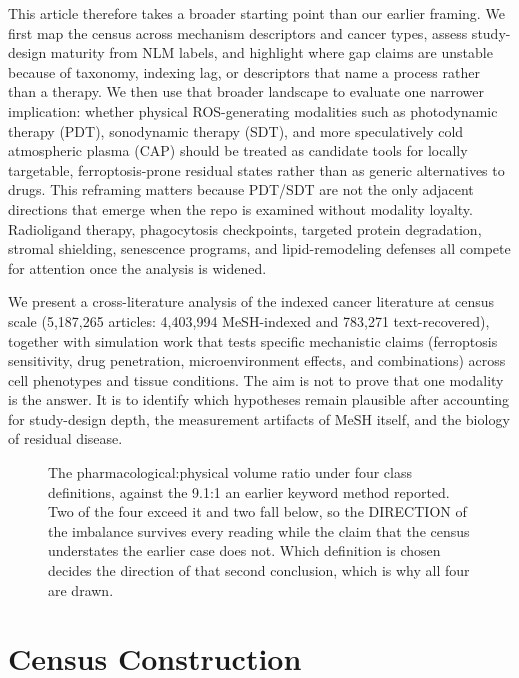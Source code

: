 \documentclass[11pt,twoside,openright]{report}
\begin{document}
This article therefore takes a broader starting point than our earlier framing. We first map the census across mechanism descriptors and cancer types, assess study-design maturity from NLM labels, and highlight where gap claims are unstable because of taxonomy, indexing lag, or descriptors that name a process rather than a therapy. We then use that broader landscape to evaluate one narrower implication: whether physical ROS-generating modalities such as photodynamic therapy (PDT), sonodynamic therapy (SDT), and more speculatively cold atmospheric plasma (CAP) should be treated as candidate tools for locally targetable, ferroptosis-prone residual states rather than as generic alternatives to drugs. This reframing matters because PDT/SDT are not the only adjacent directions that emerge when the repo is examined without modality loyalty. Radioligand therapy, phagocytosis checkpoints, targeted protein degradation, stromal shielding, senescence programs, and lipid-remodeling defenses all compete for attention once the analysis is widened.

We present a cross-literature analysis of the indexed cancer literature at census scale (5,187,265 articles: 4,403,994 MeSH-indexed and 783,271 text-recovered), together with simulation work that tests specific mechanistic claims (ferroptosis sensitivity, drug penetration, microenvironment effects, and combinations) across cell phenotypes and tissue conditions. The aim is not to prove that one modality is the answer. It is to identify which hypotheses remain plausible after accounting for study-design depth, the measurement artifacts of MeSH itself, and the biology of residual disease.

\begin{figure}[tbp]
\setcounter{figure}{0}
\caption{The pharmacological:physical volume ratio under four class definitions, against the 9.1:1 an earlier keyword method reported. Two of the four exceed it and two fall below, so the DIRECTION of the imbalance survives every reading while the claim that the census understates the earlier case does not. Which definition is chosen decides the direction of that second conclusion, which is why all four are drawn.}
\label{fig:fig1c_ratio_straddle}
\end{figure}
\dinkus
\section{Census Construction}
\end{document}
